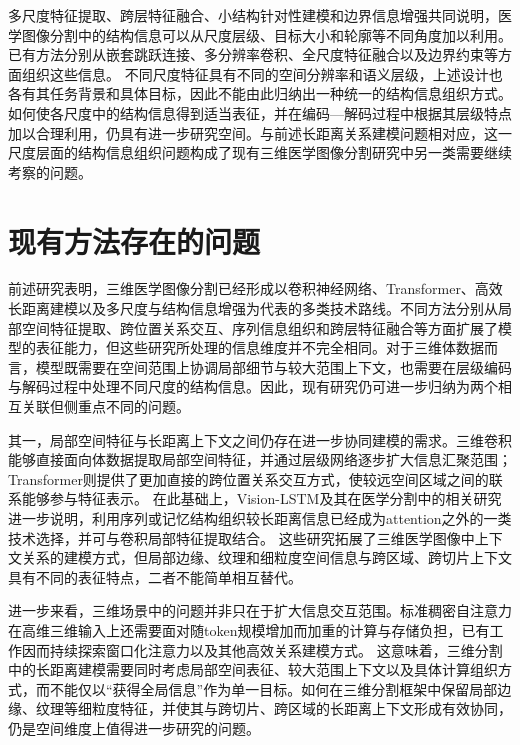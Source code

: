 多尺度特征提取、跨层特征融合、小结构针对性建模和边界信息增强共同说明，医学图像分割中的结构信息可以从尺度层级、目标大小和轮廓等不同角度加以利用。已有方法分别从嵌套跳跃连接、多分辨率卷积、全尺度特征融合以及边界约束等方面组织这些信息。\cite{kervadec2021boundary,zhou2018unetpp,huang2020unet3plus} 不同尺度特征具有不同的空间分辨率和语义层级，上述设计也各有其任务背景和具体目标，因此不能由此归纳出一种统一的结构信息组织方式。如何使各尺度中的结构信息得到适当表征，并在编码—解码过程中根据其层级特点加以合理利用，仍具有进一步研究空间。与前述长距离关系建模问题相对应，这一尺度层面的结构信息组织问题构成了现有三维医学图像分割研究中另一类需要继续考察的问题。

\section{现有方法存在的问题}

前述研究表明，三维医学图像分割已经形成以卷积神经网络、Transformer、高效长距离建模以及多尺度与结构信息增强为代表的多类技术路线。不同方法分别从局部空间特征提取、跨位置关系交互、序列信息组织和跨层特征融合等方面扩展了模型的表征能力，但这些研究所处理的信息维度并不完全相同。对于三维体数据而言，模型既需要在空间范围上协调局部细节与较大范围上下文，也需要在层级编码与解码过程中处理不同尺度的结构信息。因此，现有研究仍可进一步归纳为两个相互关联但侧重点不同的问题。

其一，局部空间特征与长距离上下文之间仍存在进一步协同建模的需求。三维卷积能够直接面向体数据提取局部空间特征，并通过层级网络逐步扩大信息汇聚范围；Transformer则提供了更加直接的跨位置关系交互方式，使较远空间区域之间的联系能够参与特征表示。\cite{cicek2016threeDunet,hatamizadeh2022unetr} 在此基础上，Vision-LSTM及其在医学分割中的相关研究进一步说明，利用序列或记忆结构组织较长距离信息已经成为attention之外的一类技术选择，并可与卷积局部特征提取结合。\cite{alkin2025visionlstm,dutta2025visionxlstmunet} 这些研究拓展了三维医学图像中上下文关系的建模方式，但局部边缘、纹理和细粒度空间信息与跨区域、跨切片上下文具有不同的表征特点，二者不能简单相互替代。

进一步来看，三维场景中的问题并非只在于扩大信息交互范围。标准稠密自注意力在高维三维输入上还需要面对随token规模增加而加重的计算与存储负担，已有工作因而持续探索窗口化注意力以及其他高效关系建模方式。\cite{shaker2024unetrpp} 这意味着，三维分割中的长距离建模需要同时考虑局部空间表征、较大范围上下文以及具体计算组织方式，而不能仅以“获得全局信息”作为单一目标。如何在三维分割框架中保留局部边缘、纹理等细粒度特征，并使其与跨切片、跨区域的长距离上下文形成有效协同，仍是空间维度上值得进一步研究的问题。

